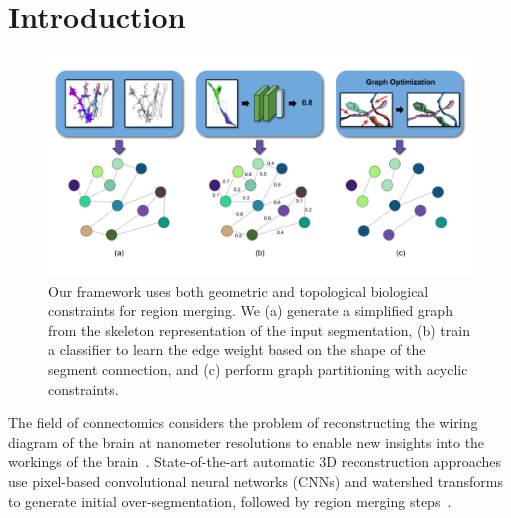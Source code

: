 \section{Introduction}

\begin{figure}[t!]
	\centering
	\includegraphics[width=\linewidth]{./figures/teaser_v4.png}
	\caption{Our framework uses both geometric and topological biological constraints for region merging. We (a) generate a simplified graph from the skeleton representation of the input segmentation, (b) train a classifier to learn the edge weight based on the shape of the segment connection, and (c) perform graph partitioning with acyclic constraints.}
	\label{fig:teaser_pipeline}
\end{figure}

The field of connectomics considers the problem of reconstructing the wiring diagram of the brain at nanometer resolutions to enable new insights into the workings of the brain~\cite{haehn2017scalable,kasthuri2015saturated}. 
State-of-the-art automatic 3D reconstruction approaches use pixel-based convolutional neural networks (CNNs) and watershed transforms to generate initial over-segmentation, followed by region merging steps~\cite{seymour2016rhoananet,lee2015recursive,nunez2014graph,parag2017anisotropic,ronneberger2015u,zlateski2015image}.

